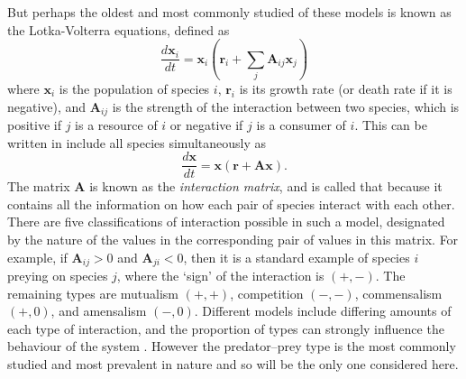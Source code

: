 But perhaps the oldest and most commonly studied of these models is known as the Lotka-Volterra equations, defined as
\begin{equation}
  \frac{d\mathbf{x}_i}{dt} = \mathbf{x}_i(\mathbf{r}_i + \sum_j\mathbf{A}_{ij}\mathbf{x}_j)
  \label{eq:lotka_volterra}
\end{equation}
where $\mathbf{x}_i$ is the population of species $i$, $\mathbf{r}_i$ is its growth rate (or death rate if it is negative), and $\mathbf{A}_{ij}$ is the strength of the interaction between two species, which is positive if $j$ is a resource of $i$ or negative if $j$ is a consumer of $i$. 
This can be written in include all species simultaneously as
\begin{equation}
    \frac{d\mathbf{x}}{dt} = \mathbf{x}(\mathbf{r} + \mathbf{Ax}).
    \label{eq:interaction_matrix}
\end{equation}
The matrix $\mathbf{A}$ is known as the \emph{interaction matrix}, and is called that because it contains all the information on how each pair of species interact with each other.
There are five classifications of interaction possible in such a model, designated by the nature of the values in the corresponding pair of values in this matrix. For example, if $\mathbf{A}_{ij}>0$ and $\mathbf{A}_{ji}<0$, then it is a standard example of species $i$ preying on species $j$, where the `sign' of the interaction is $(+,-)$. The remaining types are mutualism $(+,+)$, competition $(-,-)$, commensalism $(+,0)$, and amensalism $(-,0)$.
Different models include differing amounts of each type of interaction, and the proportion of types can strongly influence the behaviour of the system \cite{Tang2014}. However the predator--prey type is the most commonly studied and most prevalent in nature \cite{TODO} and so will be the only one considered here.

